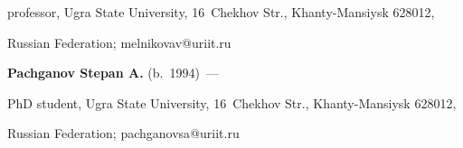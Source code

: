 professor, Ugra State University, 16~Chekhov Str., Khanty-Mansiysk 628012, 

Russian Federation; \mbox{melnikovav@uriit.ru}



\vspace*{3pt}



\noindent

\textbf{Pachganov Stepan A.} (b.\ 1994)~---

 PhD student, Ugra State University, 16~Chekhov Str., Khanty-Mansiysk 628012, 

Russian Federation; \mbox{pachganovsa@uriit.ru}

     

\label{end\stat}



\renewcommand{\bibname}{\protect\rm Литература} 

